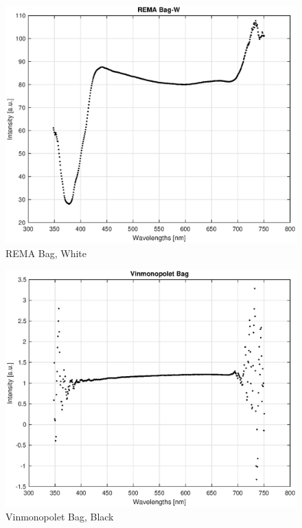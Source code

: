 \begin{appendices}
\begin{figure}
    \centering
    \includegraphics[width = 12cm]{Images/appendix/remawhite.eps}
    \caption[$\; \:$REMA Bag, White]{REMA Bag, White}
    \label{fig:remawhite}
\end{figure}

\begin{figure}
    \centering
    \includegraphics[width = 12cm]{Images/appendix/vinmono.eps}
    \caption[$\; \:$Vinmonopolet Bag]{Vinmonopolet Bag, Black}
    \label{fig:vinmono}
\end{figure}





\end{appendices}




